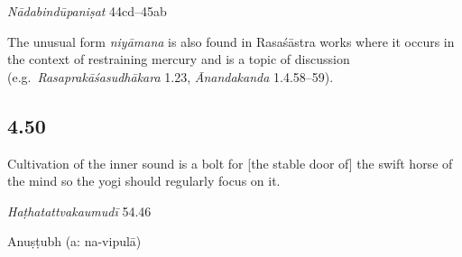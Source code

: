 \begin{ekdosis}
\begin{testimonia}[hp04_049]
\emph{Nādabindūpaniṣat} 44cd–45ab
\begin{versinnote}
\end{versinnote}
\end{testimonia}

\begin{philcomm}[hp04_049]
The unusual form \emph{niyāmana} is also found in Rasaśāstra works where it occurs in the context of restraining mercury and is a topic of discussion (e.g.~\emph{Rasaprakāśasudhākara} 1.23, \emph{Ānandakanda} 1.4.58–59).
\end{philcomm}


\subsection*{4.50}
\begin{translation}[hp04_050]
Cultivation of the inner sound is a bolt for [the stable door of] the swift horse of the mind so the yogi should regularly focus on it.
\end{translation} 


\begin{testimonia}[hp04_050]
\emph{Haṭhatattvakaumudī} 54.46
\begin{versinnote}
\end{versinnote}
\end{testimonia}

\begin{philcomm}[hp04_050]
\end{philcomm}

\begin{metre}[hp04_050]
Anuṣṭubh (a: na-vipulā)
\end{metre}


\end{ekdosis}
